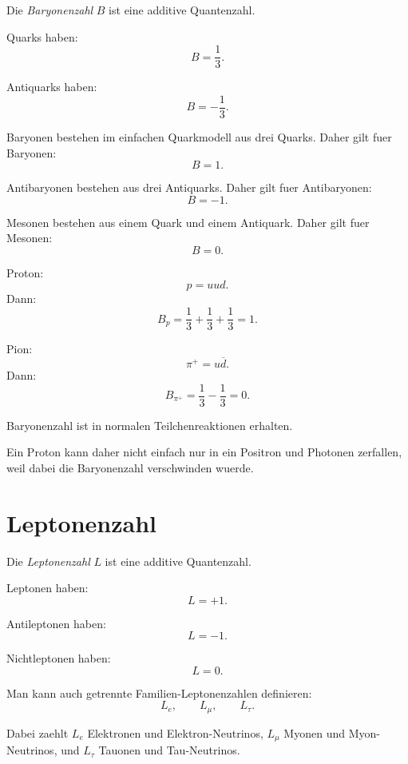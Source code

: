 \begin{definitionbox}
Die \emph{Baryonenzahl} $B$ ist eine additive Quantenzahl.

Quarks haben:
\[
    B=\frac{1}{3}.
\]

Antiquarks haben:
\[
    B=-\frac{1}{3}.
\]
\end{definitionbox}

\begin{conceptbox}
Baryonen bestehen im einfachen Quarkmodell aus drei Quarks.
Daher gilt fuer Baryonen:
\[
    B=1.
\]

Antibaryonen bestehen aus drei Antiquarks.
Daher gilt fuer Antibaryonen:
\[
    B=-1.
\]

Mesonen bestehen aus einem Quark und einem Antiquark.
Daher gilt fuer Mesonen:
\[
    B=0.
\]
\end{conceptbox}

\begin{examplebox}
Proton:
\[
    p=uud.
\]
Dann:
\[
    B_p
    =
    \frac{1}{3}
    +
    \frac{1}{3}
    +
    \frac{1}{3}
    =
    1.
\]

Pion:
\[
    \pi^+ = u\overline{d}.
\]
Dann:
\[
    B_{\pi^+}
    =
    \frac{1}{3}
    -
    \frac{1}{3}
    =
    0.
\]
\end{examplebox}

\begin{examtipbox}
Baryonenzahl ist in normalen Teilchenreaktionen erhalten.

Ein Proton kann daher nicht einfach nur in ein Positron und Photonen zerfallen,
weil dabei die Baryonenzahl verschwinden wuerde.
\end{examtipbox}

\section{Leptonenzahl}

\begin{definitionbox}
Die \emph{Leptonenzahl} $L$ ist eine additive Quantenzahl.

Leptonen haben:
\[
    L=+1.
\]

Antileptonen haben:
\[
    L=-1.
\]

Nichtleptonen haben:
\[
    L=0.
\]
\end{definitionbox}

\begin{conceptbox}
Man kann auch getrennte Familien-Leptonenzahlen definieren:
\[
    L_e,
    \qquad
    L_\mu,
    \qquad
    L_\tau.
\]

Dabei zaehlt $L_e$ Elektronen und Elektron-Neutrinos,
$L_\mu$ Myonen und Myon-Neutrinos,
und $L_\tau$ Tauonen und Tau-Neutrinos.
\end{conceptbox}


